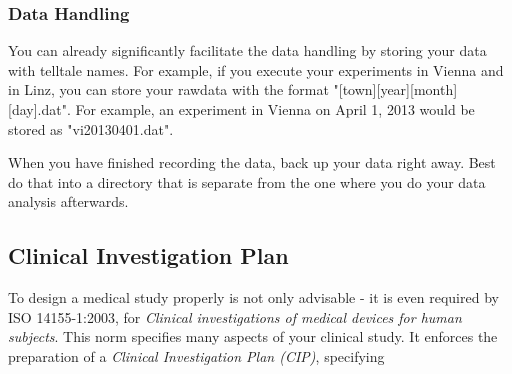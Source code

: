 \subsubsection{Data Handling}
You can already significantly facilitate the data handling by storing your data with telltale names. For example, if you execute your experiments in Vienna and in Linz, you can store your rawdata with the format "[town][year][month][day].dat". For example, an experiment in Vienna on April 1, 2013 would be stored as "vi20130401.dat".

When you have finished recording the data, back up your data right away. Best do that into a directory that is separate from the one where you do your data analysis afterwards.

\subsection{Clinical Investigation Plan}

To design a medical study properly is not only advisable - it is even required by ISO 14155-1:2003, for \emph{Clinical investigations of medical devices for human subjects}. This norm specifies many aspects of your clinical study. It enforces the preparation of a \emph{Clinical Investigation Plan (CIP)}, specifying

